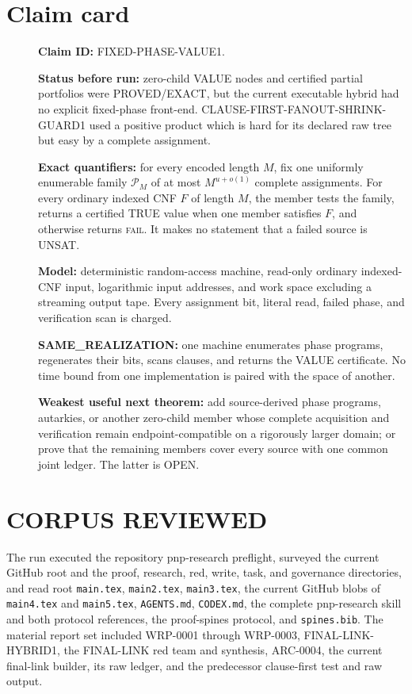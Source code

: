 \documentclass[11pt]{article}
\begin{document}
\section{Claim card}
\begin{description}
\item[] \textbf{Claim ID:} FIXED-PHASE-VALUE1.
\item[] \textbf{Status before run:} zero-child VALUE nodes and certified
partial portfolios were PROVED/EXACT, but the current executable hybrid had
no explicit fixed-phase front-end.  CLAUSE-FIRST-FANOUT-SHRINK-GUARD1 used a
positive product which is hard for its declared raw tree but easy by a
complete assignment.
\item[] \textbf{Exact quantifiers:} for every encoded length $M$, fix one
uniformly enumerable family $\mathcal P_M$ of at most $M^{u+o(1)}$ complete
assignments.  For every ordinary indexed CNF $F$ of length $M$, the member
tests the family, returns a certified TRUE value when one member satisfies
$F$, and otherwise returns \textsc{fail}.  It makes no statement that a
failed source is UNSAT.
\item[] \textbf{Model:} deterministic random-access machine, read-only
ordinary indexed-CNF input, logarithmic input addresses, and work space
excluding a streaming output tape.  Every assignment bit, literal read,
failed phase, and verification scan is charged.
\item[] \textbf{SAME\_REALIZATION:} one machine enumerates phase programs,
regenerates their bits, scans clauses, and returns the VALUE certificate.  No
time bound from one implementation is paired with the space of another.
\item[] \textbf{Weakest useful next theorem:} add source-derived phase
programs, autarkies, or another zero-child member whose complete acquisition
and verification remain endpoint-compatible on a rigorously larger domain;
or prove that the remaining members cover every source with one common joint
ledger.  The latter is OPEN.
\end{description}

\section{CORPUS REVIEWED}
The run executed the repository pnp-research preflight, surveyed the current
GitHub root and the proof, research, red, write, task, and governance
directories, and read root \texttt{main.tex}, \texttt{main2.tex},
\texttt{main3.tex}, the current GitHub blobs of \texttt{main4.tex} and
\texttt{main5.tex}, \texttt{AGENTS.md}, \texttt{CODEX.md}, the complete
pnp-research skill and both protocol references, the proof-spines protocol,
and \texttt{spines.bib}.  The material report set included WRP-0001 through
WRP-0003, FINAL-LINK-HYBRID1, the FINAL-LINK red team and synthesis,
ARC-0004, the current final-link builder, its raw ledger, and the predecessor
clause-first test and raw output.
\end{document}
